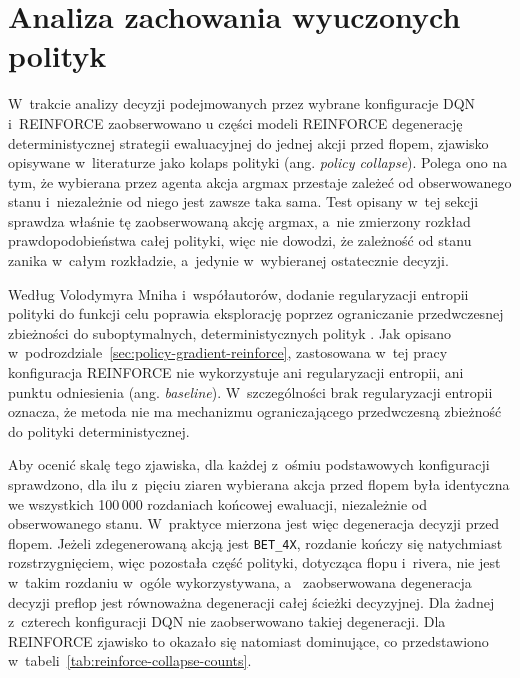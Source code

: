 \section{Analiza zachowania wyuczonych polityk}
\label{sec:wyniki-zachowanie-polityk}

W~trakcie analizy decyzji podejmowanych przez wybrane konfiguracje DQN i~REINFORCE
zaobserwowano u części modeli REINFORCE degenerację deterministycznej
strategii ewaluacyjnej do jednej akcji przed flopem, zjawisko opisywane
w~literaturze jako kolaps polityki (ang. \emph{policy collapse}). Polega ono na
tym, że wybierana przez agenta akcja argmax przestaje zależeć od
obserwowanego stanu i~niezależnie od niego jest zawsze taka sama.
Test opisany w~tej sekcji sprawdza właśnie tę zaobserwowaną
akcję argmax, a~nie zmierzony rozkład prawdopodobieństwa całej
polityki, więc nie dowodzi, że zależność od stanu zanika w~całym
rozkładzie, a~jedynie w~wybieranej ostatecznie decyzji.

Według Volodymyra Mniha i~współautorów, dodanie regularyzacji entropii
polityki do funkcji celu poprawia eksplorację poprzez ograniczanie
przedwczesnej zbieżności do suboptymalnych, deterministycznych
polityk \cite{mnih_a3c_2016}.
Jak opisano w~podrozdziale~\ref{sec:policy-gradient-reinforce},
zastosowana w~tej pracy konfiguracja REINFORCE nie wykorzystuje ani
regularyzacji entropii, ani punktu odniesienia (ang. \emph{baseline}). W~szczególności brak
regularyzacji entropii oznacza, że metoda nie ma mechanizmu
ograniczającego przedwczesną zbieżność do polityki deterministycznej.

Aby ocenić skalę tego zjawiska, dla każdej z~ośmiu podstawowych
konfiguracji sprawdzono, dla ilu z~pięciu ziaren wybierana akcja
przed flopem była identyczna we wszystkich 100\,000 rozdaniach
końcowej ewaluacji, niezależnie od obserwowanego stanu. W~praktyce
mierzona jest więc degeneracja decyzji przed flopem. Jeżeli zdegenerowaną
akcją jest \texttt{BET\_4X}, rozdanie kończy się natychmiast
rozstrzygnięciem, więc pozostała część polityki, dotycząca flopu
i~rivera, nie jest w~takim rozdaniu w~ogóle wykorzystywana, a~
zaobserwowana degeneracja decyzji preflop jest równoważna degeneracji
całej ścieżki decyzyjnej. Dla żadnej
z~czterech konfiguracji DQN nie zaobserwowano takiej degeneracji.
Dla REINFORCE zjawisko to okazało się natomiast dominujące, co
przedstawiono w~tabeli~\ref{tab:reinforce-collapse-counts}.

